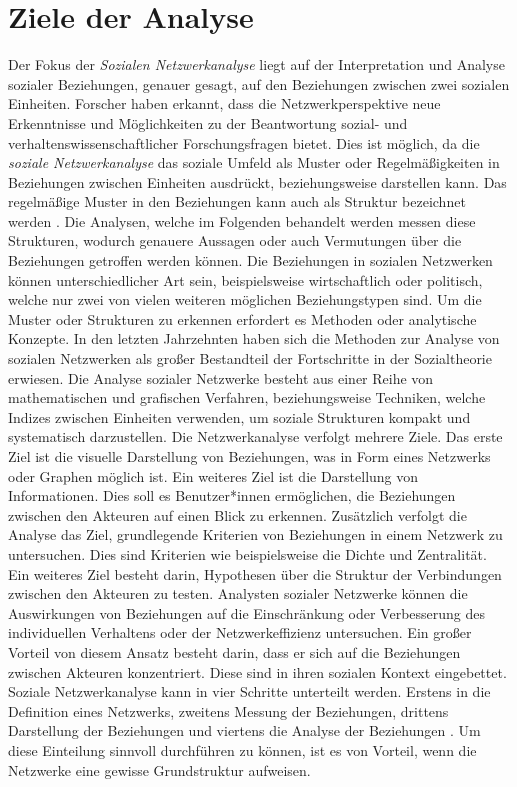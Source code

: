 \section{Ziele der Analyse}
Der Fokus der \textit{Sozialen Netzwerkanalyse} liegt auf der Interpretation und Analyse sozialer Beziehungen, genauer gesagt, auf den Beziehungen zwischen zwei sozialen Einheiten. Forscher haben erkannt, dass die Netzwerkperspektive neue Erkenntnisse und Möglichkeiten zu der Beantwortung sozial- und verhaltenswissenschaftlicher Forschungsfragen bietet. Dies ist möglich, da die \textit{soziale Netzwerkanalyse} das soziale Umfeld als Muster oder Regelmäßigkeiten in Beziehungen zwischen Einheiten ausdrückt, beziehungsweise darstellen kann. Das regelmäßige Muster in den Beziehungen kann auch als Struktur bezeichnet werden \cite{wasserman1994social}. Die Analysen, welche im Folgenden behandelt werden messen diese Strukturen, wodurch genauere Aussagen oder auch Vermutungen über die Beziehungen getroffen werden können. Die Beziehungen in sozialen Netzwerken können unterschiedlicher Art sein, beispielsweise wirtschaftlich oder politisch, welche nur zwei von vielen weiteren möglichen Beziehungstypen sind. Um die Muster oder Strukturen zu erkennen erfordert es Methoden oder analytische Konzepte. In den letzten Jahrzehnten haben sich die Methoden zur Analyse von sozialen Netzwerken als großer Bestandteil der Fortschritte in der Sozialtheorie erwiesen.
Die Analyse sozialer Netzwerke besteht aus einer Reihe von mathematischen und grafischen Verfahren, beziehungsweise Techniken, welche Indizes zwischen Einheiten verwenden, um soziale Strukturen kompakt und systematisch darzustellen.
Die Netzwerkanalyse verfolgt mehrere Ziele. Das erste Ziel ist die visuelle Darstellung von Beziehungen, was in Form eines Netzwerks oder Graphen möglich ist. Ein weiteres Ziel ist die Darstellung von Informationen. Dies soll es Benutzer*innen ermöglichen, die Beziehungen zwischen den Akteuren auf einen Blick zu erkennen. Zusätzlich verfolgt die Analyse das Ziel, grundlegende Kriterien von Beziehungen in einem Netzwerk zu untersuchen. Dies sind Kriterien wie beispielsweise die Dichte und Zentralität. Ein weiteres Ziel besteht darin, Hypothesen über die Struktur der Verbindungen zwischen den Akteuren zu testen. Analysten sozialer Netzwerke können die Auswirkungen von Beziehungen auf die Einschränkung oder Verbesserung des individuellen Verhaltens oder der Netzwerkeffizienz untersuchen. Ein großer Vorteil von diesem Ansatz besteht darin, dass er sich auf die Beziehungen zwischen Akteuren konzentriert. Diese sind in ihren sozialen Kontext eingebettet.\\
Soziale Netzwerkanalyse kann in vier Schritte unterteilt werden. Erstens in die Definition eines Netzwerks, zweitens Messung der Beziehungen, drittens Darstellung der Beziehungen und viertens die Analyse der Beziehungen \cite{wasserman1994social}. Um diese Einteilung sinnvoll durchführen zu können, ist es von Vorteil, wenn die Netzwerke eine gewisse Grundstruktur aufweisen.

